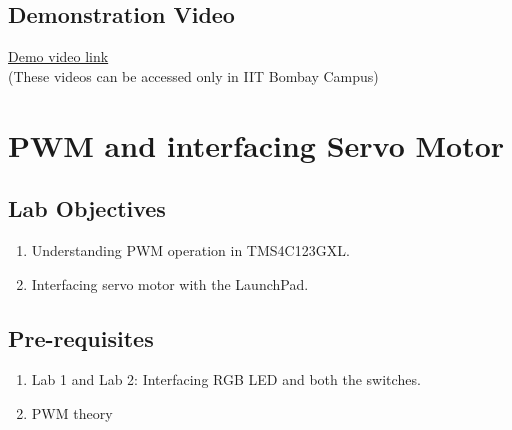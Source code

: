 \documentclass[a4paper,12pt,oneside]{book}
\begin{document}
\section{Demonstration Video}

\href{http://10.129.139.139/videos/Lab2.html}{Demo video link} \\
(These videos can be accessed only in IIT Bombay Campus)
 
 
 \newpage
\chapter{PWM and interfacing Servo Motor}
\section{Lab Objectives}
\begin{enumerate}
\item 
Understanding PWM operation in TMS4C123GXL.
\item
Interfacing servo motor with the LaunchPad.
\end{enumerate}


\section{Pre-requisites}
\begin{enumerate}
\item Lab 1 and Lab 2: Interfacing RGB LED and both the switches.
\item PWM theory
\end{enumerate}


\end{document}
